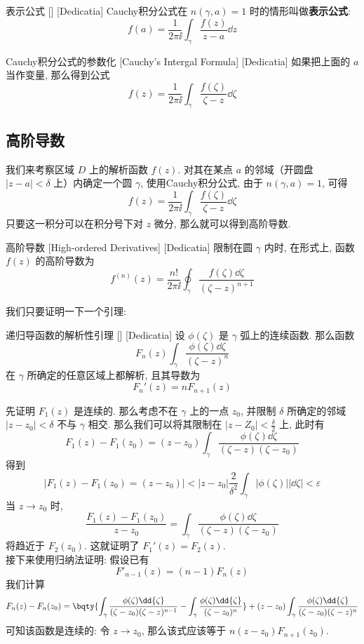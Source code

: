 \documentclass[UTF8]{ctexart}
\begin{document}
\begin{crl}
    [CauchyRepresenting]
    {表示公式}
    []
    [Dedicatia]
    Cauchy积分公式在 \( n(\gamma,a)=1 \) 时的情形叫做\textbf{表示公式}:
    \[f(a)=\frac{1}{2\pi\ii}\int_\gamma\frac{f(z)}{z-a}\dd{z}\]
\end{crl}
\begin{crl}
    [UUID]
    {Cauchy积分公式的参数化}
    [Cauchy's Intergal Formula]
    [Dedicatia]
    如果把上面的 \( a \) 当作变量, 那么得到公式
    \[f(z)=\frac{1}{2\pi\ii}\int_\gamma\frac{f(\zeta)}{\zeta-z}\dd{\zeta}\]
\end{crl}
\subsection{高阶导数}
我们来考察区域 \( D \) 上的解析函数 \( f(z) \). 对其在某点 \( a \) 的邻域（开圆盘 \( |z-a|<\delta \) 上）内确定一个圆 \( \gamma \), 使用Cauchy积分公式, 由于 \( n(\gamma,a)=1 \), 可得
\[f(z)=\frac{1}{2\pi\ii}\int_\gamma\frac{f(\zeta)}{\zeta-z}\dd{\zeta}\]
只要这一积分可以在积分号下对 \( z \) 微分, 那么就可以得到高阶导数. 
\begin{dfn}
    [HighOrderedDerivative]
    {高阶导数}
    [High-ordered Derivatives]
    [Dedicatia]
    限制在圆 \( \gamma \) 内时, 在形式上, 函数 \( f(z) \) 的高阶导数为
    \[f^{(n)}(z)=\frac{n!}{2\pi\ii}\oint_\gamma\frac{f(\zeta)\dd{\zeta}}{(\zeta-z)^{n+1}}\]
\end{dfn}
我们只要证明一下一个引理: 
\begin{lma}
    [UUID]
    {递归导函数的解析性引理}
    []
    [Dedicatia]
    设 \( \phi(\zeta) \) 是 \( \gamma \) 弧上的连续函数. 那么函数
    \[F_n(z)\int_\gamma \frac{\phi(\zeta)\dd{\zeta}}{(\zeta-z)^n}\]
    在 \( \gamma \) 所确定的任意区域上都解析, 且其导数为
    \[F_n'(z)=nF_{n+1}(z)\]
\end{lma}
\begin{prf}
    先证明 \( F_1(z) \) 是连续的. 那么考虑不在 \( \gamma \) 上的一点 \( z_0 \), 并限制 \( \delta \) 所确定的邻域 \( |z-z_0|<\delta \) 不与 \( \gamma \) 相交. 那么我们可以将其限制在 \( |z-Z_0|<\frac{\delta}{2} \) 上, 此时有
    \[F_1(z)-F_1(z_0)=(z-z_0)\int_\gamma\frac{\phi(\zeta)\dd{\zeta}}{(\zeta-z)(\zeta-z_0)}\]
    得到
    \[|F_1(z)-F_1(z_0)=(z-z_0)|<|z-z_0|\frac{2}{\delta^2}\int_\gamma|\phi(\zeta)||\dd{\zeta}|<\varepsilon\]
    当 \( z\to z_0 \) 时, 
    \[\frac{F_1(z)-F_1(z_0)}{z-z_0}=\int_\gamma\frac{\phi(\zeta)\dd{\zeta}}{(\zeta-z)(\zeta-z_0)}\]
    将趋近于 \( F_2(z_0) \). 这就证明了 \( F_1'(z)=F_2(z)  \).\\
    接下来使用归纳法证明: 假设已有
    \[F'_{n-1}(z)=(n-1)F_n(z)\]
    我们计算
    \[F_n(z)-F_n(z_0)=\bqty{\int_\gamma\frac{\phi(\zeta)\dd{\zeta}}{(\zeta-z_0)(\zeta-z)^{n-1}}-\int_\gamma\frac{\phi(\zeta)\dd{\zeta}}{(\zeta-z_0)^n}}+(z-z_0)\int_\gamma\frac{\phi(\zeta)\dd{\zeta}}{(\zeta-z_0)(\zeta-z)^{n}}\]
    可知该函数是连续的: 令 \( z\to z_0 \), 那么该式应该等于 \( n(z-z_0)F_{n+1}(z_0) \).
\end{prf}
\end{document}
